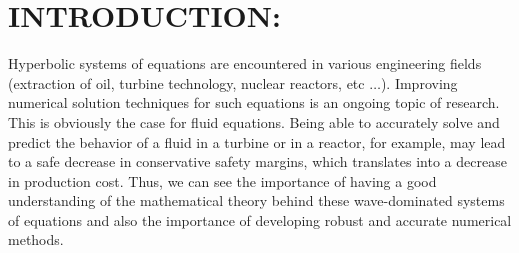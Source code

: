 %
%
%


\pagestyle{plain} %
\setcounter{page}{1}

\chapter{\uppercase {Introduction:}}
Hyperbolic systems of equations are encountered in various engineering fields (extraction of oil, turbine technology, nuclear reactors, etc $\ldots$). Improving numerical solution techniques for such equations is an ongoing topic of research. This is obviously the case for fluid equations. Being able to accurately solve and predict the behavior of a fluid in a turbine or in a reactor, for example, may lead to a safe decrease in conservative safety margins, which translates into a decrease in production cost. Thus, we can see the importance of having a good understanding of the mathematical theory behind these wave-dominated systems of equations and also the importance of developing robust and accurate numerical methods.


